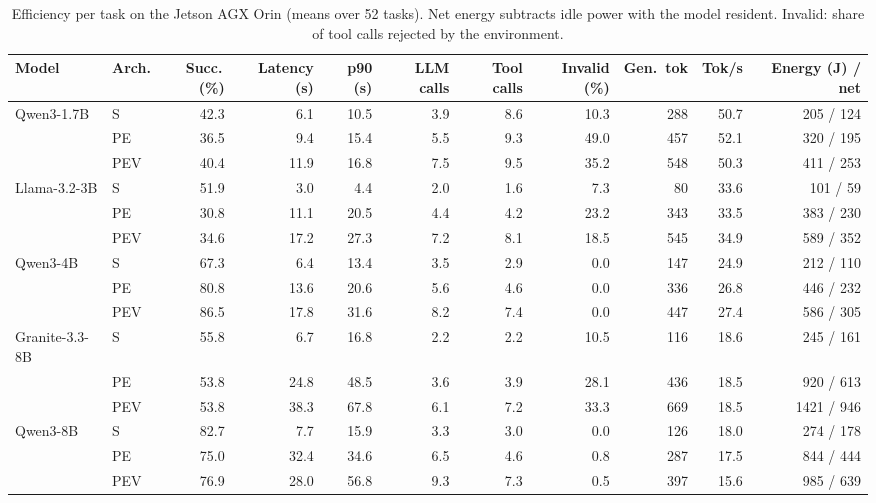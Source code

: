 \begin{table}[t]
\centering
\caption{Efficiency per task on the Jetson AGX Orin (means over 52 tasks). Net energy subtracts idle power with the model resident. Invalid: share of tool calls rejected by the environment.}
\label{tab:cost}
\begin{tabular}{@{}llrrrrrrrrr@{}}
\toprule
Model & Arch. & Succ.\,(\%) & Latency (s) & p90 (s) & LLM calls & Tool calls & Invalid (\%) & Gen.\ tok & Tok/s & Energy (J) / net \\
\midrule
Qwen3-1.7B & S & 42.3 & 6.1 & 10.5 & 3.9 & 8.6 & 10.3 & 288 & 50.7 & 205 / 124 \\
 & PE & 36.5 & 9.4 & 15.4 & 5.5 & 9.3 & 49.0 & 457 & 52.1 & 320 / 195 \\
 & PEV & 40.4 & 11.9 & 16.8 & 7.5 & 9.5 & 35.2 & 548 & 50.3 & 411 / 253 \\
\addlinespace[2pt]
Llama-3.2-3B & S & 51.9 & 3.0 & 4.4 & 2.0 & 1.6 & 7.3 & 80 & 33.6 & 101 / 59 \\
 & PE & 30.8 & 11.1 & 20.5 & 4.4 & 4.2 & 23.2 & 343 & 33.5 & 383 / 230 \\
 & PEV & 34.6 & 17.2 & 27.3 & 7.2 & 8.1 & 18.5 & 545 & 34.9 & 589 / 352 \\
\addlinespace[2pt]
Qwen3-4B & S & 67.3 & 6.4 & 13.4 & 3.5 & 2.9 & 0.0 & 147 & 24.9 & 212 / 110 \\
 & PE & 80.8 & 13.6 & 20.6 & 5.6 & 4.6 & 0.0 & 336 & 26.8 & 446 / 232 \\
 & PEV & 86.5 & 17.8 & 31.6 & 8.2 & 7.4 & 0.0 & 447 & 27.4 & 586 / 305 \\
\addlinespace[2pt]
Granite-3.3-8B & S & 55.8 & 6.7 & 16.8 & 2.2 & 2.2 & 10.5 & 116 & 18.6 & 245 / 161 \\
 & PE & 53.8 & 24.8 & 48.5 & 3.6 & 3.9 & 28.1 & 436 & 18.5 & 920 / 613 \\
 & PEV & 53.8 & 38.3 & 67.8 & 6.1 & 7.2 & 33.3 & 669 & 18.5 & 1421 / 946 \\
\addlinespace[2pt]
Qwen3-8B & S & 82.7 & 7.7 & 15.9 & 3.3 & 3.0 & 0.0 & 126 & 18.0 & 274 / 178 \\
 & PE & 75.0 & 32.4 & 34.6 & 6.5 & 4.6 & 0.8 & 287 & 17.5 & 844 / 444 \\
 & PEV & 76.9 & 28.0 & 56.8 & 9.3 & 7.3 & 0.5 & 397 & 15.6 & 985 / 639 \\
\bottomrule
\end{tabular}
\end{table}
